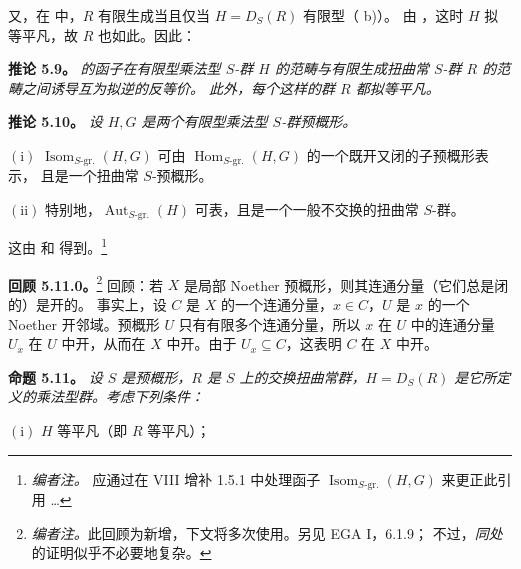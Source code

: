又，在  中，\(R\) 有限生成当且仅当
\(H=D_S(R)\) 有限型（ b)）。
由 ，这时 \(H\) 拟等平凡，故 \(R\) 也如此。因此：

\par\medskip\noindent
\textbf{推论 5.9。}\enspace
\emph{ 的函子在有限型乘法型 \(S\)-群 \(H\)
的范畴与有限生成扭曲常 \(S\)-群 \(R\) 的范畴之间诱导互为拟逆的反等价。
此外，每个这样的群 \(R\) 都拟等平凡。}

\par\medskip\noindent
\textbf{推论 5.10。}\enspace
\begingroup\itshape
设 \(H,G\) 是两个有限型乘法型 \(S\)-群预概形。

\smallskip
\noindent
\(\mathrm{(i)}\)
\(\operatorname{Isom}_{S\text{-gr.}}(H,G)\) 可由
\(\operatorname{Hom}_{S\text{-gr.}}(H,G)\) 的一个既开又闭的子预概形表示，
且是一个扭曲常 \(S\)-预概形。

\smallskip
\noindent
\(\mathrm{(ii)}\) 特别地，\(\operatorname{Aut}_{S\text{-gr.}}(H)\) 可表，且是一个一般不交换的扭曲常 \(S\)-群。
\par\endgroup

这由  和
 得到。\footnote{\textit{编者注。}
应通过在 VIII 增补 1.5.1 中处理函子 \(\operatorname{Isom}_{S\text{-gr.}}(H,G)\)
来更正此引用 \ldots}

\par\medskip\noindent
\textbf{回顾 5.11.0。}\footnote{\textit{编者注。}此回顾为新增，下文将多次使用。另见 EGA I，6.1.9；
不过，\emph{同处}的证明似乎不必要地复杂。}\enspace
回顾：若 \(X\) 是局部 Noether 预概形，则其连通分量（它们总是闭的）是开的。
事实上，设 \(C\) 是 \(X\) 的一个连通分量，\(x\in C\)，\(U\) 是 \(x\) 的一个
Noether 开邻域。预概形 \(U\) 只有有限多个连通分量，所以 \(x\) 在 \(U\) 中的连通分量
\(U_x\) 在 \(U\) 中开，从而在 \(X\) 中开。由于 \(U_x\subseteq C\)，这表明
\(C\) 在 \(X\) 中开。

\par\medskip\noindent
\textbf{命题 5.11。}\enspace
\begingroup\itshape
设 \(S\) 是预概形，\(R\) 是 \(S\) 上的交换扭曲常群，\(H=D_S(R)\)
是它所定义的乘法型群。考虑下列条件：

\smallskip
\noindent
\(\mathrm{(i)}\) \(H\) 等平凡（即 \(R\) 等平凡）；

